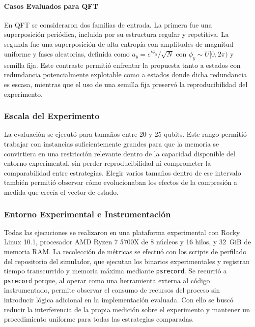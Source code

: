 \paragraph{Casos Evaluados para QFT} En QFT se consideraron dos familias de entrada. La primera fue una superposición periódica, incluida por su estructura regular y repetitiva. La segunda fue una superposición de alta entropía con amplitudes de magnitud uniforme y fases aleatorias, definida como $a_y = e^{i\phi_y}/\sqrt{N}$ con $\phi_y \sim U[0, 2\pi)$ y semilla fija. Este contraste permitió enfrentar la propuesta tanto a estados con redundancia potencialmente explotable como a estados donde dicha redundancia es escasa, mientras que el uso de una semilla fija preservó la reproducibilidad del experimento.

\subsubsection{Escala del Experimento}

La evaluación se ejecutó para tamaños entre 20 y 25 qubits. Este rango permitió trabajar con instancias suficientemente grandes para que la memoria se convirtiera en una restricción relevante dentro de la capacidad disponible del entorno experimental, sin perder reproducibilidad ni comprometer la comparabilidad entre estrategias. Elegir varios tamaños dentro de ese intervalo también permitió observar cómo evolucionaban los efectos de la compresión a medida que crecía el vector de estado.

\subsubsection{Entorno Experimental e Instrumentación}

Todas las ejecuciones se realizaron en una plataforma experimental con Rocky Linux 10.1, procesador AMD Ryzen 7 5700X de 8 núcleos y 16 hilos, y 32~GiB de memoria RAM. La recolección de métricas se efectuó con los scripts de perfilado del repositorio del simulador, que ejecutan los binarios experimentales y registran tiempo transcurrido y memoria máxima mediante \texttt{psrecord}. Se recurrió a \texttt{psrecord} porque, al operar como una herramienta externa al código instrumentado, permite observar el consumo de recursos del proceso sin introducir lógica adicional en la implementación evaluada. Con ello se buscó reducir la interferencia de la propia medición sobre el experimento y mantener un procedimiento uniforme para todas las estrategias comparadas.


